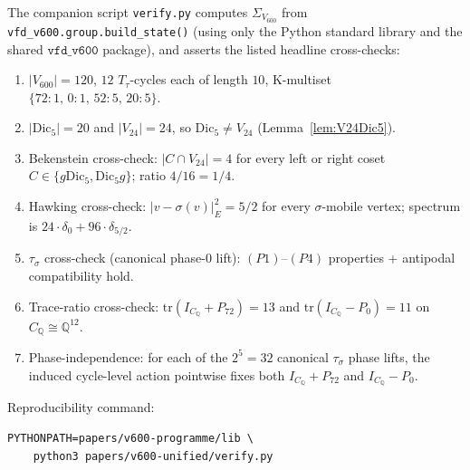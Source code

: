 \documentclass[11pt]{article}
\theoremstyle{remark}
\newcommand{\Vsixhundred}{V_{600}}
\newcommand{\Dicfive}{\mathrm{Dic}_5}
\newcommand{\Vtwentyfour}{V_{24}}
\newcommand{\Sigmaspine}{\Sigma_{\Vsixhundred}}
\newcommand{\CQ}{C_{\mathbb{Q}}}
\newcommand{\Ttau}{T_{\tau}}
\newcommand{\sigmaG}{\sigma}
\newcommand{\tausigma}{\tau_\sigma}
\newcommand{\PK}[1]{P_{#1}}
\begin{document}
The companion script \texttt{verify.py} computes $\Sigmaspine$ from
\texttt{vfd\_v600.group.build\_state()} (using only the Python
standard library and the shared $\mathtt{vfd\_v600}$ package), and
asserts the listed headline cross-checks:
\begin{enumerate}[leftmargin=2em]
\item $|\Vsixhundred| = 120$, $12$ $\Ttau$-cycles each of length
$10$, K-multiset $\{72{:}1,\,0{:}1,\,52{:}5,\,20{:}5\}$.
\item $|\Dicfive| = 20$ and $|\Vtwentyfour| = 24$, so
$\Dicfive \neq \Vtwentyfour$ (Lemma~\ref{lem:V24Dic5}).
\item Bekenstein cross-check:
$|C \cap \Vtwentyfour| = 4$ for every left or right coset
$C \in \{g\Dicfive, \Dicfive g\}$; ratio $4/16 = 1/4$.
\item Hawking cross-check:
$|v - \sigmaG(v)|_E^2 = 5/2$ for every $\sigmaG$-mobile vertex;
spectrum is $24\cdot \delta_0 + 96\cdot\delta_{5/2}$.
\item $\tausigma$ cross-check (canonical phase-$0$ lift):
$(P1)$--$(P4)$ properties + antipodal compatibility hold.
\item Trace-ratio cross-check:
$\mathrm{tr}(I_{\CQ} + \PK{72}) = 13$ and
$\mathrm{tr}(I_{\CQ} - \PK{0}) = 11$ on $\CQ \cong \mathbb{Q}^{12}$.
\item Phase-independence: for each of the $2^5 = 32$ canonical
$\tausigma$ phase lifts, the induced cycle-level action pointwise
fixes both $I_{\CQ} + \PK{72}$ and $I_{\CQ} - \PK{0}$.
\end{enumerate}
Reproducibility command:
\begin{verbatim}
PYTHONPATH=papers/v600-programme/lib \
    python3 papers/v600-unified/verify.py
\end{verbatim}



\end{document}
